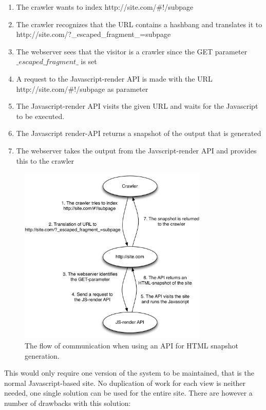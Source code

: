 \begin{enumerate}
\item The crawler wants to index http://site.com/\#!/subpage
\item The crawler recognizes that the URL contains a hashbang and translates it to http://site.com/?\_escaped\_fragment\_=subpage
\item The webserver sees that the visitor is a crawler since the GET parameter \\$\_escaped\_fragment\_$ is set
\item A request to the Javascript-render API is made with the URL  http://site.com/\#!/subpage as parameter
\item The Javascript-render API visits the given URL and waits for the Javascript to be executed.
\item The Javascript render-API returns a snapshot of the output that is generated
\item The webserver takes the output from the Javscript-render API and provides this to the crawler
\end{enumerate}

\begin{figure}[h!]
	\centerline{\includegraphics[width=90mm]{gfx/seo_flow_phantom.png}}
	\caption{The flow of communication when using an API for HTML snapshot generation.}
	\label{fig:flow_phantom}
\end{figure}

 This would only require one version of the system to be maintained, that is the normal Javascript-based site. No duplication of work for each view is neither needed, one single solution can be used for the entire site. There are however a number of drawbacks with this solution:

